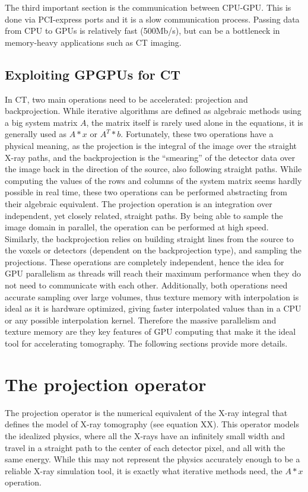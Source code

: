 The third important section is the communication between CPU-GPU. This is done via PCI-express ports and it is a slow communication process. Passing data from CPU to GPUs is relatively fast (500Mb/s), but can be a bottleneck in memory-heavy applications such as CT imaging.



\subsection{Exploiting GPGPUs for CT}

In CT, two main operations need to be accelerated: projection and backprojection. While iterative algorithms are defined as algebraic methods using a big system matrix $A$, the matrix itself is rarely used alone in the equations, it is generally used as $A*x$ or $A^T*b$. Fortunately, these two operations have a physical meaning, as the projection is the integral of the image over the straight X-ray paths, and the backprojection is the ``smearing'' of the detector data over the image back in the direction of the source, also following straight paths. While computing the values of the rows and columns of the system matrix seems hardly possible in real time, these two operations can be performed abstracting from their algebraic equivalent. The projection operation is an integration over independent, yet closely related, straight paths. By being able to sample the image domain in parallel, the operation can be performed at high speed. Similarly, the backprojection relies on building straight lines from the source to the voxels or detectors (dependent on the backprojection type), and sampling the projections. These operations are completely independent, hence the idea for GPU parallelism as threads will reach their maximum performance when they do not need to communicate with each other.  Additionally, both operations need accurate sampling over large volumes, thus texture memory with interpolation is ideal as it is hardware optimized, giving faster interpolated values than in a CPU or any possible interpolation kernel. Therefore the massive parallelism and texture memory are they key features of GPU computing that make it the ideal tool for accelerating tomography. The following sections provide more details.

\section{The projection operator}
The projection operator is the numerical equivalent of the X-ray integral that defines the model of X-ray tomography (see equation XX). This operator models the idealized physics, where all the X-rays have an infinitely small width and travel in a straight path to the center of each detector pixel, and all with the same energy. While this may not represent the physics accurately enough to be a reliable X-ray  simulation tool, it is exactly what iterative methods need, the $A*x$ operation. 


